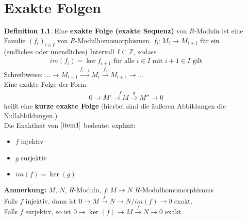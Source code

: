 \documentclass[10pt,a4paper,numbers=endperiod]{scrreprt}
\theoremstyle{definition}
\newtheorem{defi}[satz]{Definition}
\def\ZZ{{\mathbb Z}}
\begin{document}
\chapter{Exakte Folgen}

\begin{defi}
	Eine \textbf{exakte Folge (exakte Sequenz)} von $R$-Moduln ist eine Familie $(f_i)_{i \in I}$ von $R$-Modulhomomorphismen.
	$f_i: M_i \rightarrow M_{i+1}$ für ein (endliches oder unendliches) Intervall $I \subseteq \ZZ$, sodass \begin{align*}
	im(f_i) = \ker f_{i+1} \text{  für alle } i \in I \text{ mit } i+1 \in I \text{ gilt}
	\end{align*}
	Schreibweise: \hspace*{3mm} $\ldots \longrightarrow M_{i-1} \overset{f_{i-1}}{\longrightarrow} M_i \overset{f_i}{\longrightarrow} M_{i+1} \longrightarrow \ldots$\\
	Eine exakte Folge der Form
	\begin{align}
		\label{item1} 0 \longrightarrow M' \overset{f}{\longrightarrow M} \overset{g}{\longrightarrow} M'' \longrightarrow 0 
	\end{align}
	heißt eine \textbf{kurze exakte Folge} (hierbei sind die äußeren Abbildungen die Nullabbildungen.)\\
	Die Exaktheit von $\ref{item1}$ bedeutet explizit: 
	\begin{itemize}
		\item $f$ injektiv
		\item $g$ surjektiv
		\item $im(f) = \ker(g)$
	\end{itemize}
\end{defi}

\textbf{Anmerkung:} $M$, $N$, $R$-Moduln, $f: M \longrightarrow N$ $R$-Modulhomomorphismus\\
Falls $f$ injektiv, dann ist $0 \longrightarrow M \overset{f}{\longrightarrow} N \longrightarrow N/im(f) \longrightarrow 0$ exakt.\\
Falls $f$ surjektiv, so ist $0 \longrightarrow \ker(f) \longrightarrow M \overset{f}{\longrightarrow} N \longrightarrow 0$ exakt.\\
\end{document}

